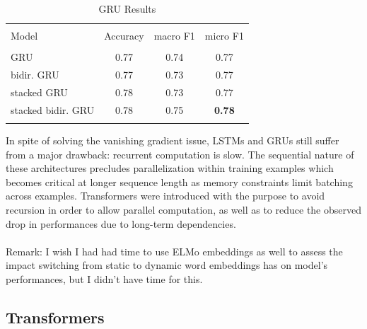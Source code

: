 \documentclass[final]{cvpr}
\begin{document}
\begin{table}[h!]
	\begin{center}
		\begin{tabular}{ l c c c  } 
			\hline
			\\ [-1.7mm] 
			Model & Accuracy & macro F1 & micro F1 \\ [0.7mm] 
			\hline
			\\ [-1.5mm] 
			GRU & 0.77 & 0.74 & 0.77 \\
			bidir. GRU & 0.77 & 0.73 & 0.77 \\
			stacked GRU & 0.78 & 0.73 & 0.77 \\
			stacked bidir. GRU & 0.78 & 0.75 & \textbf{0.78} \\ [0.5mm] 
			\hline
			\\ [-2.9mm] 
		\end{tabular}
		\caption{GRU Results}
		\label{tab:gru}
	\end{center}
\end{table}

\vspace{-4mm}

In spite of solving the vanishing gradient issue, LSTMs and GRUs still suffer from a major drawback: recurrent computation is slow. The sequential nature of these architectures precludes parallelization within training examples which becomes critical at longer sequence length as memory constraints limit batching across examples. Transformers \cite{transformer} were introduced with the purpose to avoid recursion in order to allow parallel computation, as well as to reduce the observed drop in performances due to long-term dependencies.\\
\\
Remark: I wish I had had time to use ELMo embeddings as well to assess the impact switching from static to dynamic word embeddings has on model's performances, but I didn't have time for this.


\subsection{Transformers}\label{sec:transformers}
\end{document}
